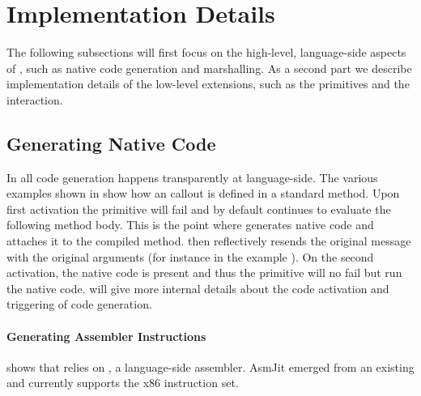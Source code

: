 \section{\NBFFI Implementation Details}

The following subsections will first focus on the high-level, language-side aspects of \NB, such as native code generation and marshalling.
As a second part we describe implementation details of the low-level extensions, such as the \NB primitives and the \JIT interaction.

\subsection{Generating Native Code}

In \NB all code generation happens transparently at language-side.
The various examples shown in  show how an \FFI callout is defined in a standard method.
Upon first activation the \NB primitive will fail and by default continues to evaluate the following method body.
This is the point where \NB generates native code and attaches it to the compiled method.
\NB then reflectively resends the original message with the original arguments (for instance  in the example ).
On the second activation, the native code is present and thus the primitive will no fail but run the native code.
 will give more internal details about the code activation and triggering of code generation.

\paragraph{Generating Assembler Instructions}

 shows that \NB relies on , a language-side assembler.
AsmJit emerged from an existing  and currently supports the x86 instruction set.

